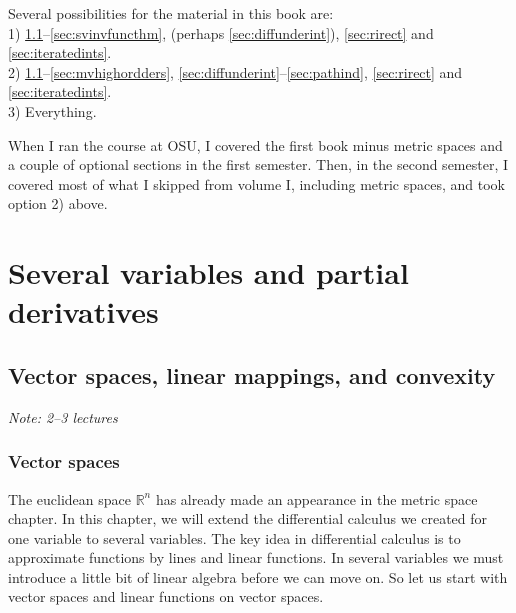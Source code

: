 \documentclass[12pt]{book}
\newcommand{\R}{{\mathbb{R}}}
\newcommand{\sectionnotes}[1]{\noindent \emph{Note: #1} \medskip \par}
\theoremstyle{plain}
\theoremstyle{remark}
\theoremstyle{definition}
\theoremstyle{exercise}
\theoremstyle{example}
\begin{document}
Several possibilities for the material in this book are:\\
1) \ref{sec:vectorspaces}--\ref{sec:svinvfuncthm},
(perhaps \ref{sec:diffunderint}), \ref{sec:rirect} and \ref{sec:iteratedints}.\\
2) \ref{sec:vectorspaces}--\ref{sec:mvhighordders},
\ref{sec:diffunderint}--\ref{sec:pathind}, \ref{sec:rirect} and \ref{sec:iteratedints}.\\
3) Everything.

When I ran the course at OSU, I covered the first book minus metric spaces
and a couple of optional sections in the first semester.
Then, in the second semester, I covered
most of what I skipped from volume I, including metric spaces, and
took option 2) above.



\chapter{Several variables and partial derivatives} \label{pd:chapter}



\section{Vector spaces, linear mappings, and convexity}
\label{sec:vectorspaces}

\sectionnotes{2--3 lectures}

\subsection{Vector spaces}

The euclidean space $\R^n$ has already made an appearance in the metric
space chapter.  In this chapter, we will extend the differential calculus
we created for one variable to several variables.  The key idea in
differential calculus is to approximate functions by lines and linear
functions.  In several variables we must introduce a little bit of linear
algebra before we can move on.  So
let us start with vector spaces and linear functions on vector spaces.
\end{document}

